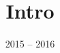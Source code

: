 \documentclass{beamer}
\date{2015 -- 2016}
\title{Intro}
\begin{document}
\begin{frame}
\titlepage
\end{frame}


\end{document}
